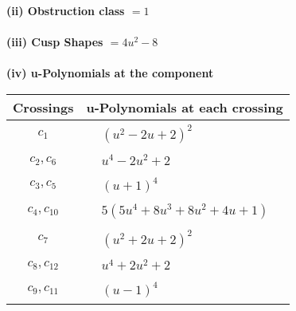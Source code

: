 \documentclass[1p]{elsarticle_modified}
\theoremstyle{definition}
\begin{document}
\flushleft \textbf{(ii) Obstruction class $= 1$}\\~\\
\flushleft \textbf{(iii) Cusp Shapes $= 4 u^2-8$}\\~\\
\newpage\renewcommand{\arraystretch}{1}
\flushleft \textbf{(iv) u-Polynomials at the component}\newline \\
\begin{tabular}{m{50pt}|m{274pt}}
Crossings & \hspace{64pt}u-Polynomials at each crossing \\
\hline $$\begin{aligned}c_{1}\end{aligned}$$&$\begin{aligned}
&(u^2-2 u+2)^2
\end{aligned}$\\
\hline $$\begin{aligned}c_{2},c_{6}\end{aligned}$$&$\begin{aligned}
&u^4-2 u^2+2
\end{aligned}$\\
\hline $$\begin{aligned}c_{3},c_{5}\end{aligned}$$&$\begin{aligned}
&(u+1)^4
\end{aligned}$\\
\hline $$\begin{aligned}c_{4},c_{10}\end{aligned}$$&$\begin{aligned}
&5(5 u^4+8 u^3+8 u^2+4 u+1)
\end{aligned}$\\
\hline $$\begin{aligned}c_{7}\end{aligned}$$&$\begin{aligned}
&(u^2+2 u+2)^2
\end{aligned}$\\
\hline $$\begin{aligned}c_{8},c_{12}\end{aligned}$$&$\begin{aligned}
&u^4+2 u^2+2
\end{aligned}$\\
\hline $$\begin{aligned}c_{9},c_{11}\end{aligned}$$&$\begin{aligned}
&(u-1)^4
\end{aligned}$\\
\hline
\end{tabular}\\~\\
\end{document}
